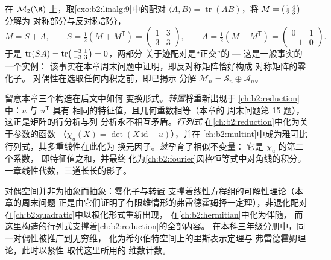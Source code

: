 \begin{example}[迹配对分解矩阵空间]\label{ex:b2:linalg:tracepairing}
在 $\mathcal{M}_2(\R)$ 上，取\cref{exo:b2:linalg:9}中的配对 $\langle A, B\rangle =
\operatorname{tr}(AB)$，将 $M =
\begin{psmallmatrix}1 & 4\\ 2 & 3\end{psmallmatrix}$ 分解为
对称部分与反对称部分，
\[
M = S + A, \qquad
S = \tfrac12(M + M^{\mathsf T}) =
\begin{pmatrix}1 & 3\\ 3 & 3\end{pmatrix},
\qquad
A = \tfrac12(M - M^{\mathsf T}) =
\begin{pmatrix}0 & 1\\ -1 & 0\end{pmatrix}.
\]
于是 $\operatorname{tr}(SA) = \operatorname{tr}
\begin{psmallmatrix}-3 & 1\\ -3 & 3\end{psmallmatrix} = 0$，两部分
关于迹配对是“正交”的 --- 这是一般事实的一个实例：
该事实在本章周末问题中证明，即反对称矩阵恰好构成
对称矩阵的零化子。
对偶性在选取任何内积之前，即已揭示
分解 $\mathcal{M}_n = \mathcal{S}_n \oplus
\mathcal{A}_n$。
\end{example}

\begin{remark}[本卷中的几种视角]\label{rem:b2:linalg:perspectives}
留意本章三个构造在后文中如何
变换形式。\emph{转置}将重新出现于
\cref{ch:b2:reduction}中：$u$ 与 $u^{\mathsf T}$ 具有
相同的特征值，且几何重数相等（本章的
周末问题第 15 题），这正是矩阵的行分析与列
分析永不相互矛盾。\emph{行列式}
在\cref{ch:b2:reduction}中化为关于参数的函数
（$\chi_u(X) = \det(X\,\mathrm{id} - u)$），并在
\cref{ch:b2:multint}中成为雅可比行列式，其多重线性在此化为
换元因子。\emph{迹}孕育了相似不变量：
它是 $\chi_u$ 的第二个系数，
即特征值之和，并最终
化为\cref{ch:b2:fourier}风格恒等式中对角线的积分。
一章线性代数，三道长长的影子。
\end{remark}

\begin{remark}[本章的应用]
对偶空间并非为抽象而抽象：零化子与转置
支撑着线性方程组的可解性理论（本章的周末问题
正是由它们证明了有限维情形的弗雷德霍姆择一定理），非退化配对
在\cref{ch:b2:quadratic}中以极化形式重新出现，
在\cref{ch:b2:hermitian}中化为伴随，
而这里构造的行列式支撑着\cref{ch:b2:reduction}的全部内容。
在本科三年级分册中，同一对偶性被推广到无穷维，
化为希尔伯特空间上的里斯表示定理与
弗雷德霍姆理论，此时以紧性
取代这里所用的
维数计数。
\end{remark}

